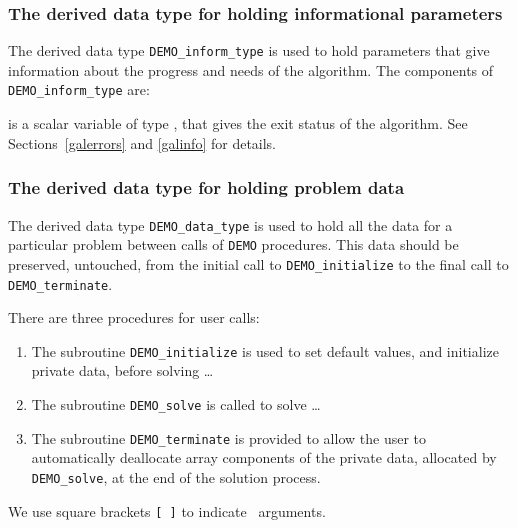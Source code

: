 \documentclass{galahad}
\newcommand{\packagename}{DEMO}
\begin{document}

\subsubsection{The derived data type for holding informational
 parameters}\label{typeinform}
The derived data type 
{\tt \packagename\_inform\_type} 
is used to hold parameters that give information about the progress and needs 
of the algorithm. The components of
{\tt \packagename\_inform\_type} 
are:

\begin{description}
 is a scalar variable of type \integer, that gives the
exit status of the algorithm. See Sections~\ref{galerrors} and \ref{galinfo}
for details.
\end{description}


\subsubsection{The derived data type for holding problem data}\label{typedata}
The derived data type 
{\tt \packagename\_data\_type} 
is used to hold all the data for a particular problem between calls of 
{\tt \packagename} procedures. 
This data should be preserved, untouched, from the initial call to 
{\tt \packagename\_initialize}
to the final call to
{\tt \packagename\_terminate}.


\galarguments
There are three procedures for user calls:

\begin{enumerate}
\item The subroutine 
      {\tt \packagename\_initialize} 
      is used to set default values, and initialize private data, 
      before solving \ldots
\item The subroutine 
      {\tt \packagename\_solve} 
      is called to solve \ldots
\item The subroutine 
      {\tt \packagename\_terminate} 
      is provided to allow the user to automatically deallocate array 
       components of the private data, allocated by 
       {\tt \packagename\_solve}, 
       at the end of the solution process. 
\end{enumerate}
We use square brackets {\tt [ ]} to indicate \optional\ arguments.
\end{document}
